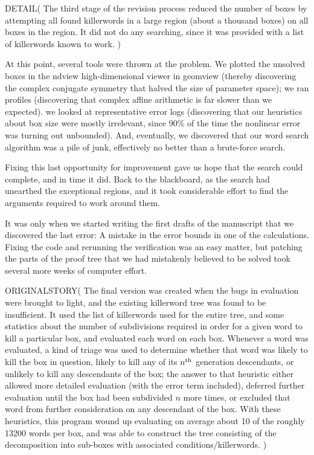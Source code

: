 \begin{itemize}
DETAIL(
The third stage of the revision process reduced the number of boxes by attempting all found 
killerwords in a large region (about a thousand boxes) on all boxes 
in the region.  It did not  do any searching, since it was provided with a 
list of killerwords known to work.
)

At this point, several tools were thrown at the problem. We plotted the unsolved boxes in the ndview high-dimensional viewer in geomview (thereby discovering the complex conjugate symmetry that halved the size of parameter space); we ran profiles (discovering that complex affine arithmetic is far slower than we expected). we looked at representative error logs (discovering that our heuristics about box size were mostly irrelevant, since 90\% of the time the nonlinear error was turning out unbounded). And, eventually, we discovered that our word search algorithm was a pile of junk, effectively no better than a brute-force search.

Fixing this last opportunity for improvement gave us hope that the search could complete, and in time it did.  Back to the blackboard, as the search had unearthed the exceptional regions, and it took considerable effort to find the arguments required to work around them.

It was only when we started writing the first drafts of the manuscript that we discovered the last error: A mistake in the error bounds in one of the calculations. Fixing the code and rerunning the verification was an easy matter, but patching the parts of the proof tree that we had mistakenly believed to be solved took several more weeks of computer effort.

ORIGINALSTORY(
The final version was created when the bugs in evaluation were 
brought to light, and the existing killerword tree was found to be insufficient.  
It used the list of killerwords used for the entire tree, and some 
statistics about the number of subdivisions required in order for a 
given word to kill a particular box, and evaluated each word on each box.  Whenever 
a word was evaluated, a kind of triage was used to determine 
whether that word was likely to kill the box in question, likely to kill 
any of its $n^{\rm th}$ generation descendants, or unlikely to kill any 
descendants of the box; the answer to that heuristic either allowed more 
detailed evaluation (with the error term included), deferred further 
evaluation until the box had been subdivided $n$ more times, or 
excluded that word from further consideration on any descendant of 
the box.  With these heuristics, this program wound up evaluating on 
average about 10 of the roughly 13200 words per box, and was able to 
construct the tree consisting of the decomposition into sub-boxes with associated conditions/killerwords.
)


\end{itemize}
